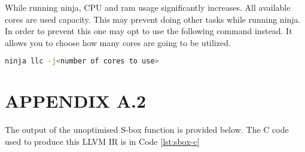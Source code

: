 While running ninja, CPU and ram usage significantly increases. All available cores are used capacity. This may prevent doing other tasks while running ninja. In order to prevent this one may opt to use the following command instead. It allows you to choose how many cores are going to be utilized.
\begin{lstlisting}[language=Bash]
	ninja llc -j<number of cores to use>
\end{lstlisting}


\section*{APPENDIX A.2}
\renewcommand{\theequation}{A.2.\arabic{equation}}
\setcounter{equation}{0}
The output of the unoptimised S-box function is provided below. The C code used to produce this LLVM IR is in Code \ref{lst:sbox-c}



\newpage

